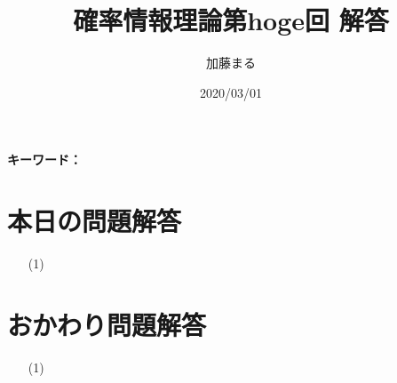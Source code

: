 \documentclass[a4j,uplatex]{jsarticle}
\title{確率情報理論第hoge回 解答}
\author{加藤まる}
\date{2020/03/01}
\begin{document}
\maketitle
\bf キーワード：

\section*{本日の問題解答}
\begin{itemize}
  \item[(1)]
\end{itemize}

\section*{おかわり問題解答}
\begin{itemize}
  \item[(1)]
\end{itemize}
\end{document}
